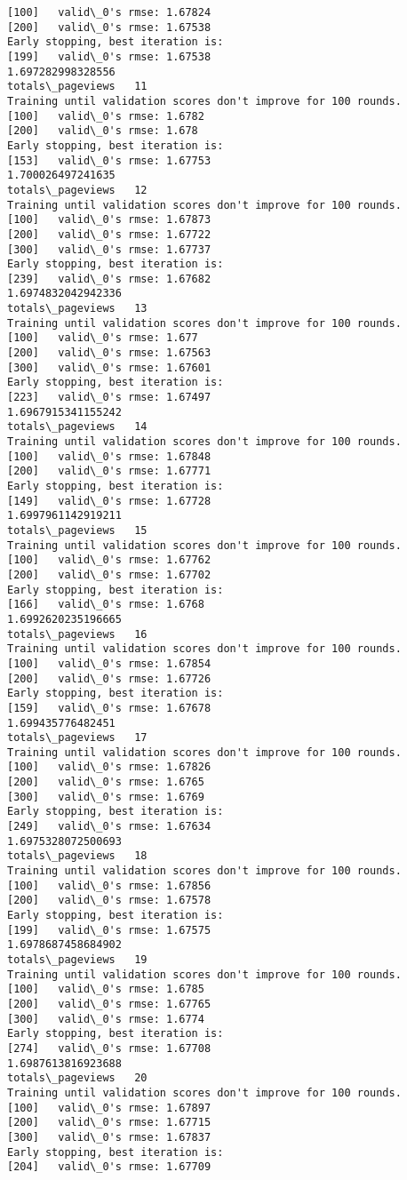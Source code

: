 \documentclass[11pt]{article}
\begin{document}
\begin{Verbatim}[commandchars=\\\{\}]
[100]	valid\_0's rmse: 1.67824
[200]	valid\_0's rmse: 1.67538
Early stopping, best iteration is:
[199]	valid\_0's rmse: 1.67538
1.697282998328556
totals\_pageviews   11
Training until validation scores don't improve for 100 rounds.
[100]	valid\_0's rmse: 1.6782
[200]	valid\_0's rmse: 1.678
Early stopping, best iteration is:
[153]	valid\_0's rmse: 1.67753
1.700026497241635
totals\_pageviews   12
Training until validation scores don't improve for 100 rounds.
[100]	valid\_0's rmse: 1.67873
[200]	valid\_0's rmse: 1.67722
[300]	valid\_0's rmse: 1.67737
Early stopping, best iteration is:
[239]	valid\_0's rmse: 1.67682
1.6974832042942336
totals\_pageviews   13
Training until validation scores don't improve for 100 rounds.
[100]	valid\_0's rmse: 1.677
[200]	valid\_0's rmse: 1.67563
[300]	valid\_0's rmse: 1.67601
Early stopping, best iteration is:
[223]	valid\_0's rmse: 1.67497
1.6967915341155242
totals\_pageviews   14
Training until validation scores don't improve for 100 rounds.
[100]	valid\_0's rmse: 1.67848
[200]	valid\_0's rmse: 1.67771
Early stopping, best iteration is:
[149]	valid\_0's rmse: 1.67728
1.6997961142919211
totals\_pageviews   15
Training until validation scores don't improve for 100 rounds.
[100]	valid\_0's rmse: 1.67762
[200]	valid\_0's rmse: 1.67702
Early stopping, best iteration is:
[166]	valid\_0's rmse: 1.6768
1.6992620235196665
totals\_pageviews   16
Training until validation scores don't improve for 100 rounds.
[100]	valid\_0's rmse: 1.67854
[200]	valid\_0's rmse: 1.67726
Early stopping, best iteration is:
[159]	valid\_0's rmse: 1.67678
1.699435776482451
totals\_pageviews   17
Training until validation scores don't improve for 100 rounds.
[100]	valid\_0's rmse: 1.67826
[200]	valid\_0's rmse: 1.6765
[300]	valid\_0's rmse: 1.6769
Early stopping, best iteration is:
[249]	valid\_0's rmse: 1.67634
1.6975328072500693
totals\_pageviews   18
Training until validation scores don't improve for 100 rounds.
[100]	valid\_0's rmse: 1.67856
[200]	valid\_0's rmse: 1.67578
Early stopping, best iteration is:
[199]	valid\_0's rmse: 1.67575
1.6978687458684902
totals\_pageviews   19
Training until validation scores don't improve for 100 rounds.
[100]	valid\_0's rmse: 1.6785
[200]	valid\_0's rmse: 1.67765
[300]	valid\_0's rmse: 1.6774
Early stopping, best iteration is:
[274]	valid\_0's rmse: 1.67708
1.6987613816923688
totals\_pageviews   20
Training until validation scores don't improve for 100 rounds.
[100]	valid\_0's rmse: 1.67897
[200]	valid\_0's rmse: 1.67715
[300]	valid\_0's rmse: 1.67837
Early stopping, best iteration is:
[204]	valid\_0's rmse: 1.67709

\end{Verbatim}
\end{document}
